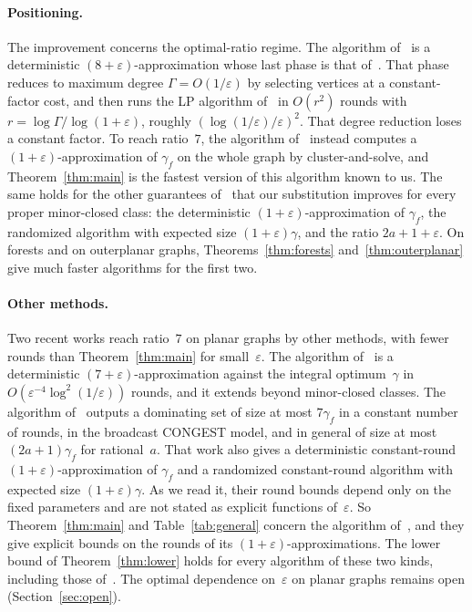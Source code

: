 \documentclass[11pt]{article}
\theoremstyle{remark}
\begin{document}
\paragraph{Positioning.} The improvement concerns the optimal-ratio regime. The algorithm
of~\cite{W26} is a deterministic $(8+\varepsilon)$-approximation whose last phase is that
of~\cite{HKOSV22}. That phase reduces to maximum degree $\Gamma=O(1/\varepsilon)$ by selecting
vertices at a constant-factor cost, and then runs the LP algorithm
of~\cite{KMW16} in $O(r^2)$ rounds with $r=\log\Gamma/\log(1+\varepsilon)$, roughly
$(\log(1/\varepsilon)/\varepsilon)^2$. That degree reduction loses a constant factor. To reach ratio~$7$,
the algorithm of~\cite{AS26} instead computes a $(1+\varepsilon)$-approximation of $\gamma_f$ on the
whole graph by cluster-and-solve, and Theorem~\ref{thm:main} is the fastest version of this algorithm
known to us. The same holds for the other guarantees of~\cite[Thm.~6.2]{AS26} that our substitution
improves for every proper minor-closed class: the deterministic $(1+\varepsilon)$-approximation of
$\gamma_f$, the randomized algorithm with expected size $(1+\varepsilon)\gamma$, and the ratio
$2a+1+\varepsilon$. On forests and on outerplanar graphs, Theorems~\ref{thm:forests}
and~\ref{thm:outerplanar} give much faster algorithms for the first two.

\paragraph{Other methods.} Two recent works reach ratio~$7$ on planar graphs by other methods, with
fewer rounds than Theorem~\ref{thm:main} for small~$\varepsilon$. The algorithm of~\cite{P26} is a deterministic
$(7+\varepsilon)$-approximation against the integral optimum~$\gamma$ in
$O(\varepsilon^{-4}\log^2(1/\varepsilon))$ rounds, and it extends beyond minor-closed classes. The
algorithm of~\cite{ASW26} outputs a dominating set of size at most $7\gamma_f$ in a constant number
of rounds, in the broadcast CONGEST model, and in general of size at most $(2a+1)\gamma_f$ for
rational~$a$. That work also gives a deterministic constant-round $(1+\varepsilon)$-approximation of
$\gamma_f$ and a randomized constant-round algorithm with expected size $(1+\varepsilon)\gamma$. As
we read it, their round bounds depend only on the fixed parameters and are not stated as explicit
functions of~$\varepsilon$. So Theorem~\ref{thm:main} and Table~\ref{tab:general} concern the
algorithm of~\cite{AS26}, and they give explicit bounds on the rounds of its
$(1+\varepsilon)$-approximations. The lower bound of Theorem~\ref{thm:lower} holds for every
algorithm of these two kinds, including those of~\cite{ASW26}. The optimal dependence on~$\varepsilon$
on planar graphs remains open (Section~\ref{sec:open}).
\end{document}
